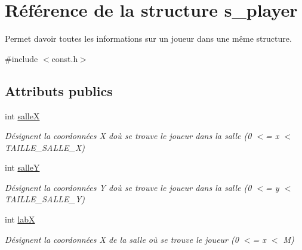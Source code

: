 \hypertarget{structs__player}{}\section{Référence de la structure s\+\_\+player}
\label{structs__player}


Permet d\textquotesingle{}avoir toutes les informations sur un joueur dans une même structure.  




{\ttfamily \#include $<$const.\+h$>$}

\subsection*{Attributs publics}
\begin{DoxyCompactItemize}
\item 
\mbox{\label{structs__player_afa4d8cff39d1b5c831bae90705573213}} 
int \hyperlink{structs__player_afa4d8cff39d1b5c831bae90705573213}{salleX}
\begin{DoxyCompactList}\small\item\em Désignent la coordonnées X d\textquotesingle{}où se trouve le joueur dans la salle (0 $<$= x $<$ T\+A\+I\+L\+L\+E\+\_\+\+S\+A\+L\+L\+E\+\_\+X) \end{DoxyCompactList}\item 
\mbox{\label{structs__player_a021191fa6ae535a6c8c49b80c1a2d504}} 
int \hyperlink{structs__player_a021191fa6ae535a6c8c49b80c1a2d504}{salleY}
\begin{DoxyCompactList}\small\item\em Désignent la coordonnées Y d\textquotesingle{}où se trouve le joueur dans la salle (0 $<$= y $<$ T\+A\+I\+L\+L\+E\+\_\+\+S\+A\+L\+L\+E\+\_\+Y) \end{DoxyCompactList}\item 
\mbox{\label{structs__player_aacf060a91eeaa9e2d543962397ae6d8f}} 
int \hyperlink{structs__player_aacf060a91eeaa9e2d543962397ae6d8f}{labX}
\begin{DoxyCompactList}\small\item\em Désignent la coordonnées X de la salle où se trouve le joueur (0 $<$= x $<$ M) \end{DoxyCompactList}\item 
\mbox{\label{structs__player_a3640ccc04b8a35ce5990d3ecec8edc4d}} 

\end{DoxyCompactItemize}
